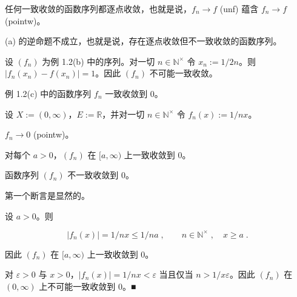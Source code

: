 \begin{examplenote}

\begin{items}
\item

任何一致收敛的函数序列都逐点收敛，也就是说，$ f_n \to f $ (unf) 蕴含 $ f_n \to f $ (pointw)。

\item

(a) 的逆命题不成立，也就是说，存在逐点收敛但不一致收敛的函数序列。

\proofhead
设 $ (f_n) $ 为例 1.2(b) 中的序列。对一切 $ n \in \mathbb{N}^\times $ 令 $ x_n := 1/2n $。则 $ |f_n(x_n) - f(x_n)| = 1 $。因此 $ (f_n) $ 不可能一致收敛。
\item

例 1.2(c) 中的函数序列 $ f_{n} $ 一致收敛到 0。

\item

设 $ X := (0, \infty) $，$ E := \mathbb{R} $，并对一切 $ n \in \mathbb{N}^\times $ 令 $ f_n(x) := 1/nx $。

\begin{subitems}
\item

$ f_{n} \rightarrow 0 $ (pointw)。

\item

对每个 $a>0$，$(f_{n})$ 在 $[a,\infty)$ 上一致收敛到 0。

\item

函数序列 $ (f_{n}) $ 不一致收敛到 0。

\proofhead
第一个断言是显然的。
\end{subitems}

\begin{subitems}
\item

设 $a > 0$。则

\[
|f_{n}(x)|=1/n x\leq1/n a\;,\qquad n\in\mathbb{N}^{\times}\;,\quad x\geq a\;.
\]

因此 $(f_{n})$ 在 $[a,\infty)$ 上一致收敛到 0。

\item

对 $ \varepsilon > 0 $ 与 $ x > 0 $，$ |f_n(x)| = 1/nx < \varepsilon $ 当且仅当 $ n > 1/x\varepsilon $。因此 $ (f_n) $ 在 $ (0, \infty) $ 上不可能一致收敛到 0。■

\end{subitems}


\end{items}
\end{examplenote}
